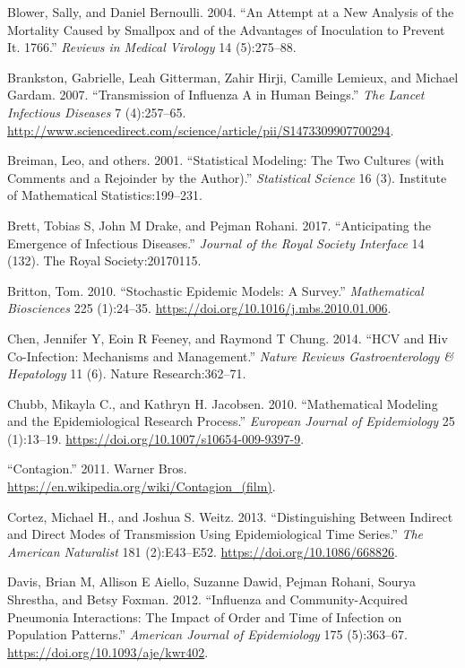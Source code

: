\documentclass[]{book}
\theoremstyle{definition}
\theoremstyle{definition}
\theoremstyle{definition}
\theoremstyle{remark}
\begin{document}
\leavevmode\hypertarget{ref-blower04}{}%
Blower, Sally, and Daniel Bernoulli. 2004. ``An Attempt at a New
Analysis of the Mortality Caused by Smallpox and of the Advantages of
Inoculation to Prevent It. 1766.'' \emph{Reviews in Medical Virology} 14
(5):275--88.

\leavevmode\hypertarget{ref-brankston07}{}%
Brankston, Gabrielle, Leah Gitterman, Zahir Hirji, Camille Lemieux, and
Michael Gardam. 2007. ``Transmission of Influenza A in Human Beings.''
\emph{The Lancet Infectious Diseases} 7 (4):257--65.
\url{http://www.sciencedirect.com/science/article/pii/S1473309907700294}.

\leavevmode\hypertarget{ref-breiman01}{}%
Breiman, Leo, and others. 2001. ``Statistical Modeling: The Two Cultures
(with Comments and a Rejoinder by the Author).'' \emph{Statistical
Science} 16 (3). Institute of Mathematical Statistics:199--231.

\leavevmode\hypertarget{ref-brett17}{}%
Brett, Tobias S, John M Drake, and Pejman Rohani. 2017. ``Anticipating
the Emergence of Infectious Diseases.'' \emph{Journal of the Royal
Society Interface} 14 (132). The Royal Society:20170115.

\leavevmode\hypertarget{ref-britton10a}{}%
Britton, Tom. 2010. ``Stochastic Epidemic Models: A Survey.''
\emph{Mathematical Biosciences} 225 (1):24--35.
\url{https://doi.org/10.1016/j.mbs.2010.01.006}.

\leavevmode\hypertarget{ref-chen14}{}%
Chen, Jennifer Y, Eoin R Feeney, and Raymond T Chung. 2014. ``HCV and
Hiv Co-Infection: Mechanisms and Management.'' \emph{Nature Reviews
Gastroenterology \& Hepatology} 11 (6). Nature Research:362--71.

\leavevmode\hypertarget{ref-chubb10}{}%
Chubb, Mikayla C., and Kathryn H. Jacobsen. 2010. ``Mathematical
Modeling and the Epidemiological Research Process.'' \emph{European
Journal of Epidemiology} 25 (1):13--19.
\url{https://doi.org/10.1007/s10654-009-9397-9}.

\leavevmode\hypertarget{ref-contagionmovie}{}%
``Contagion.'' 2011. Warner Bros.
\url{https://en.wikipedia.org/wiki/Contagion_(film)}.

\leavevmode\hypertarget{ref-cortez13}{}%
Cortez, Michael H., and Joshua S. Weitz. 2013. ``Distinguishing Between
Indirect and Direct Modes of Transmission Using Epidemiological Time
Series.'' \emph{The American Naturalist} 181 (2):E43--E52.
\url{https://doi.org/10.1086/668826}.

\leavevmode\hypertarget{ref-davis12}{}%
Davis, Brian M, Allison E Aiello, Suzanne Dawid, Pejman Rohani, Sourya
Shrestha, and Betsy Foxman. 2012. ``Influenza and Community-Acquired
Pneumonia Interactions: The Impact of Order and Time of Infection on
Population Patterns.'' \emph{American Journal of Epidemiology} 175
(5):363--67. \url{https://doi.org/10.1093/aje/kwr402}.
\end{document}

